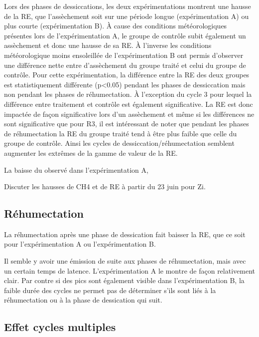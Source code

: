 Lors des phases de dessiccations, les deux expérimentations montrent une hausse de la RE, que l'assèchement soit sur une période longue (expérimentation A) ou plus courte (expérimentation B).
À cause des conditions météorologiques présentes lors de l'expérimentation A, le groupe de contrôle subit également un assèchement et donc une hausse de sa RE.
À l'inverse les conditions météorologique moins ensoleillée de l'expérimentation B ont permis d'observer une différence nette entre d'assèchement du groupe traité et celui du groupe de contrôle.
Pour cette expérimentation, la différence entre la RE des deux groupes est statistiquement différente (p<0.05) pendant les phases de dessiccation mais non pendant les phases de réhumectation.
À l'exception du cycle 3 pour lequel la différence entre traitement et contrôle est également significative.
La RE est donc impactée de façon significative lors d'un assèchement et même si les différences ne sont significative que pour R3, il est intéressant de noter que pendant les phases de réhumectation la RE du groupe traité tend à être plus faible que celle du groupe de contrôle.
Ainsi les cycles de dessiccation/réhumectation semblent augmenter les extrêmes de la gamme de valeur de la RE.

La baisse du \chh observé dans l'expérimentation A, 


Discuter les hausses de CH4 et de RE à partir du 23 juin pour Zi.

\subsection{Réhumectation}

La réhumectation après une phase de dessication fait baisser la RE, que ce soit pour l'expérimentation A ou l'expérimentation B.

Il semble y avoir une émission de \chh suite aux phases de réhumectation, mais avec un certain temps de latence.
L'expérimentation A le montre  de façon relativement clair.
Par contre si des pics sont également visible dans l'expérimentation B, la faible durée des cycles ne permet pas de déterminer s'ils sont liés à la réhumectation ou à la phase de dessication qui suit.

\subsection{Effet cycles multiples}

